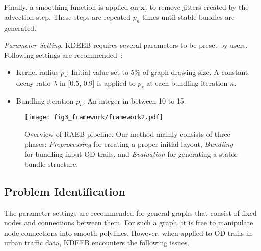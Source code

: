Finally, a smoothing function is applied on $\textbf{x}_j$ to remove jitters created by the advection step.
These steps are repeated $p_n$ times until stable bundles are generated.

\vspace{2mm}
\noindent
\textit{Parameter Setting}.
KDEEB requires several parameters to be preset by users.
Following settings are recommended~\cite{van2016cubu}:
\begin{itemize}

\item 
Kernel radius $p_r$: Initial value set to 5\% of graph drawing size.
A constant decay ratio $\lambda$ in [0.5, 0.9] is applied to $p_r$ at each bundling iteration $n$.

\item
Bundling iteration $p_n$: An integer in between 10 to 15.

\end{itemize}

\begin{figure*}[t]
	\centering
	\texttt{[image: fig3\_framework/framework2.pdf]}
	\vspace{-3mm}
	\caption{Overview of RAEB pipeline.
	Our method mainly consists of three phases: \textit{Preprocessing} for creating a proper initial layout, \textit{Bundling} for bundling input OD trails, and \textit{Evaluation} for generating a stable bundle structure.}
	\label{fig:framework}
	\vspace{-4mm}
\end{figure*}

\subsection{Problem Identification}
The parameter settings are recommended for general graphs that consist of fixed nodes and connections between them.
For such a graph, it is free to manipulate node connections into smooth polylines.
However, when applied to OD trails in urban traffic data, KDEEB encounters the following issues.

